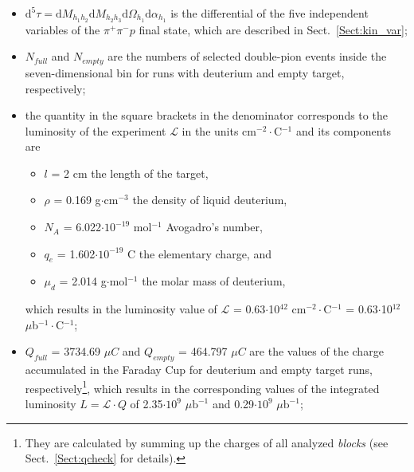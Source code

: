 \begin{itemize}
\item $\textrm{d}^{5}\tau = \textrm{d}M_{h_{1}h_{2}} \textrm{d}M_{h_{2}h_{3}} \textrm{d}\Omega_{h_1} \textrm{d}\alpha_{h_1}$ is the differential of the five independent variables of the $\pi^{+}\pi^{-}p$ final state, which are described in Sect.~\ref{Sect:kin_var};\vspace{-0.25em}
\item $N_{full}$ and $N_{empty}$ are the numbers of selected double-pion events inside the seven-dimensional bin for runs with deuterium and empty target, respectively;\vspace{-0.25em} 
\item the quantity in the square brackets in the denominator corresponds to the luminosity of the experiment $\mathcal{L}$ in the units cm$^{-2}\cdot$C$^{-1}$ and its components are\vspace{-0.25em}
\begin{itemize}
\item [ ]  $l$ = 2 cm the length of the target,\vspace{-0.4em}
\item [ ]  $\rho$ = 0.169 g$\cdot$cm$^{-3}$ the density of liquid deuterium,\vspace{-0.4em}
\item [ ]  $N_{A}$ = 6.022$\cdot 10^{-19}$ mol$^{-1}$ Avogadro's number,\vspace{-0.4em}
\item [ ]  $q_{e}$ = 1.602$\cdot 10^{-19}$ C the elementary charge, and \vspace{-0.4em}
\item [ ]  $\mu_{d}$ = 2.014 g$\cdot$mol$^{-1}$ the molar mass of deuterium,\vspace{-0.25em}
\end{itemize}
which results in the luminosity value of $\mathcal{L}$ = 0.63$\cdot$10$^{42}$ cm$^{-2}\cdot$C$^{-1}$ = 0.63$\cdot$10$^{12}$ $\mu$b$^{-1}\cdot$C$^{-1}$;\vspace{-0.25em}


\item $Q_{full}$ = 3734.69 $\mu C$ and $Q_{empty}$ = 464.797 $\mu C$ are the values of the charge accumulated in the Faraday Cup for deuterium and empty target runs, respectively\footnote[11]{They are calculated by summing up the charges of all analyzed \textit{blocks} (see Sect.~\ref{Sect:qcheck} for details).}, which results in the corresponding values of the integrated luminosity $L=\mathcal{L}\cdot Q$ of 2.35$\cdot 10^{9}$ $\mu \text{b}^{-1}$ and 0.29$\cdot 10^{9}$ $\mu \text{b}^{-1}$; \vspace{-0.25em}


\end{itemize}
